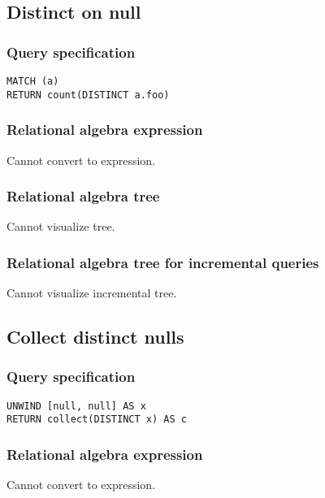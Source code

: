 \subsection{Distinct on null}

\subsubsection*{Query specification}

\begin{lstlisting}
MATCH (a)
RETURN count(DISTINCT a.foo)
\end{lstlisting}

\subsubsection*{Relational algebra expression}

Cannot convert to expression.

\subsubsection*{Relational algebra tree}

Cannot visualize tree.

\subsubsection*{Relational algebra tree for incremental queries}

Cannot visualize incremental tree.

\subsection{Collect distinct nulls}

\subsubsection*{Query specification}

\begin{lstlisting}
UNWIND [null, null] AS x
RETURN collect(DISTINCT x) AS c
\end{lstlisting}

\subsubsection*{Relational algebra expression}

Cannot convert to expression.

